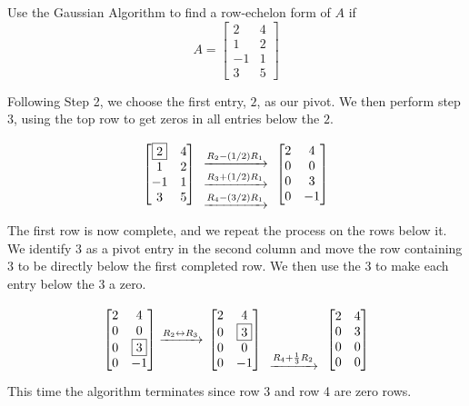 \documentclass{ximera}
\begin{document}
 
\begin{example}\label{ex:non-augmented}
 
Use the Gaussian Algorithm to find a row-echelon form of $A$ if $$A=\begin{bmatrix}2&4\\1&2\\-1&1\\3&5\end{bmatrix}$$
\begin{explanation}
Following Step 2, we choose the first entry, $2$, as our pivot.  We then perform step 3, using the top row to get zeros in all entries below the $2$.
$$\begin{bmatrix} \fbox{$2$}&4\\1&2\\-1&1\\3&5\end{bmatrix}
  \begin{array}{c}
  \\
  \xrightarrow{R_2-(1/2)R_1}\\
  \xrightarrow{R_3+(1/2)R_1}\\
 \xrightarrow{R_4-(3/2)R_1}\\
 \end{array}
\begin{bmatrix}2&4\\0&0\\0&3\\0&-1\end{bmatrix}
$$
The first row is now complete, and we repeat the process on the rows below it. We identify $3$ as a pivot entry in the second column and move the row containing $3$ to be directly below the first completed row.  We then use the $3$ to make each entry below the $3$ a zero. 
 
$$\begin{bmatrix}2&4\\0&0\\0&\fbox{$3$}\\0&-1\end{bmatrix}
\xrightarrow{R_2\leftrightarrow R_3}\\
\begin{bmatrix}2&4\\0&\fbox{$3$}\\0&0\\0&-1\end{bmatrix}
  \begin{array}{c}
 \\
\\
  \\
 \xrightarrow{R_4+\frac{1}{3}R_2}\\
 \end{array}
 \begin{bmatrix}2&4\\0&3\\0&0\\0&0\end{bmatrix}
$$
This time the algorithm terminates since row 3 and row 4 are zero rows.
\end{explanation}
\end{example}
 
\end{document}
